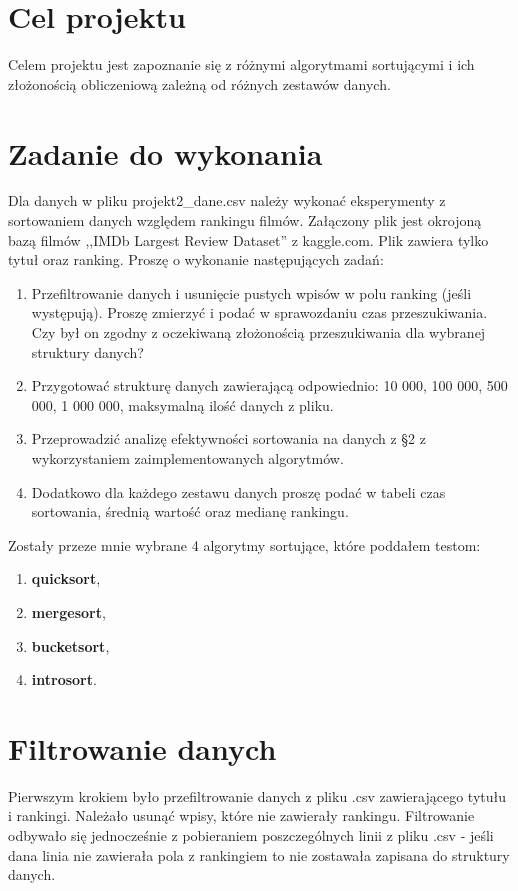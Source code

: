 \documentclass[12pt]{article}
\begin{document}

    
\tableofcontents
\newpage
\section{Cel projektu}
Celem projektu jest zapoznanie się z różnymi algorytmami sortującymi i ich złożonością obliczeniową zależną od różnych zestawów danych. 
\section{Zadanie do wykonania}
Dla danych w pliku projekt2\_dane.csv należy wykonać eksperymenty z sortowaniem danych względem
rankingu filmów. Załączony plik jest okrojoną bazą filmów ,,IMDb Largest Review Dataset'' z kaggle.com.
Plik zawiera tylko tytuł oraz ranking. Proszę o wykonanie następujących zadań:
\begin{enumerate}
    \item Przefiltrowanie danych i usunięcie pustych wpisów w polu ranking (jeśli występują). Proszę zmierzyć
    i podać w sprawozdaniu czas przeszukiwania. Czy był on zgodny z oczekiwaną złożonością przeszukiwania
    dla wybranej struktury danych?
    \item Przygotować strukturę danych zawierającą odpowiednio: 10 000, 100 000, 500 000, 1 000 000,
    maksymalną ilość danych z pliku.
    \item Przeprowadzić analizę efektywności sortowania na danych z §2 z wykorzystaniem zaimplementowanych
    algorytmów. 
    \item  Dodatkowo dla każdego zestawu danych proszę podać w tabeli czas sortowania, średnią wartość
    oraz medianę rankingu.
    
\end{enumerate}
Zostały przeze mnie wybrane 4 algorytmy sortujące, które poddałem testom:

\begin{enumerate}
    \item \textbf{quicksort},
    \item \textbf{mergesort},
    \item \textbf{bucketsort},
    \item \textbf{introsort}.
\end{enumerate}
\section{Filtrowanie danych}
Pierwszym krokiem było przefiltrowanie danych z pliku .csv zawierającego tytułu i rankingi. Należało usunąć wpisy, 
które nie zawierały rankingu. Filtrowanie odbywało się jednocześnie z pobieraniem poszczególnych linii z pliku .csv - jeśli dana 
linia nie zawierała pola z rankingiem to nie zostawała zapisana do struktury danych. 
\end{document}
